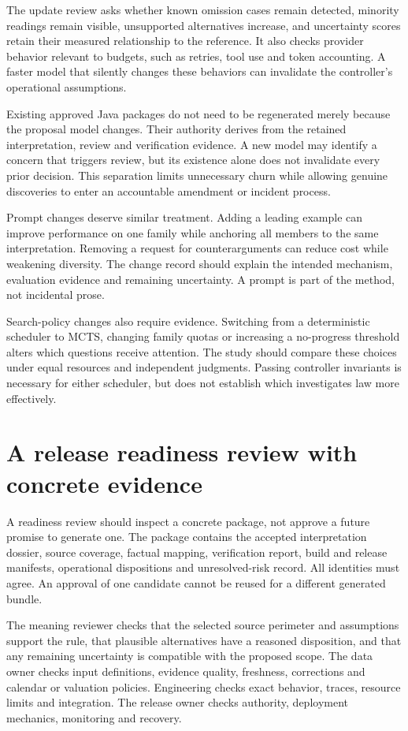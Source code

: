 The update review asks whether known omission cases remain detected, minority
readings remain visible, unsupported alternatives increase, and uncertainty scores
retain their measured relationship to the reference. It also checks provider
behavior relevant to budgets, such as retries, tool use and token accounting.
A faster model that silently changes these behaviors can invalidate the
controller's operational assumptions.

Existing approved Java packages do not need to be regenerated merely because the
proposal model changes. Their authority derives from the retained interpretation,
review and verification evidence. A new model may identify a concern that triggers
review, but its existence alone does not invalidate every prior decision. This
separation limits unnecessary churn while allowing genuine discoveries to enter
an accountable amendment or incident process.

Prompt changes deserve similar treatment. Adding a leading example can improve
performance on one family while anchoring all members to the same interpretation.
Removing a request for counterarguments can reduce cost while weakening diversity.
The change record should explain the intended mechanism, evaluation evidence and
remaining uncertainty. A prompt is part of the method, not incidental prose.

Search-policy changes also require evidence. Switching from a deterministic
scheduler to MCTS, changing family quotas or increasing a no-progress threshold
alters which questions receive attention. The study should compare these choices
under equal resources and independent judgments. Passing controller invariants
is necessary for either scheduler, but does not establish which investigates law
more effectively.

\section{A release readiness review with concrete evidence}

A readiness review should inspect a concrete package, not approve a future promise
to generate one. The package contains the accepted interpretation dossier, source
coverage, factual mapping, verification report, build and release manifests,
operational dispositions and unresolved-risk record. All identities must agree.
An approval of one candidate cannot be reused for a different generated bundle.

The meaning reviewer checks that the selected source perimeter and assumptions
support the rule, that plausible alternatives have a reasoned disposition, and
that any remaining uncertainty is compatible with the proposed scope. The data
owner checks input definitions, evidence quality, freshness, corrections and
calendar or valuation policies. Engineering checks exact behavior, traces,
resource limits and integration. The release owner checks authority, deployment
mechanics, monitoring and recovery.

